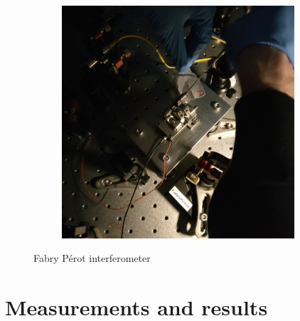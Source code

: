 \begin{figure}[H]
\begin{subfigure}[b]{0.48\textwidth}
		\includegraphics[width=0.95\textwidth]{figures/fabry-perot/setup/confocal-setup-higher-modes-2}
		\caption{}
		\label{fig:confocal-setup-higher-modes-2}
	\end{subfigure}
	\caption{Fabry Pérot interferometer}
\end{figure}




\section{Measurements and results}

